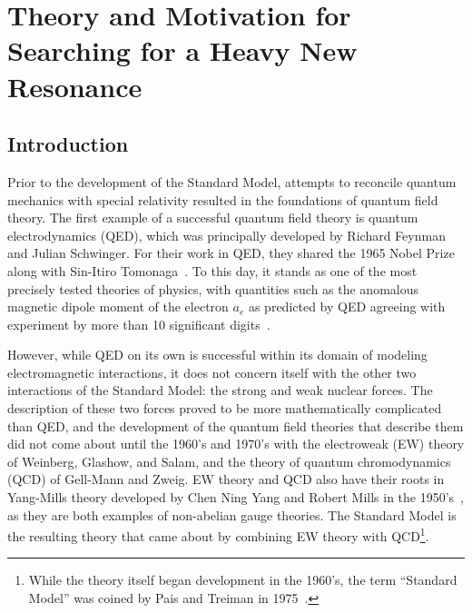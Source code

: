 
\chapter{Theory and Motivation for Searching for a Heavy New Resonance}
\label{chap:theory}

\section{Introduction}

Prior to the development of the Standard Model, attempts to reconcile quantum mechanics with special relativity resulted in the foundations of quantum field theory.
The first example of a successful quantum field theory is quantum electrodynamics (QED), which was principally developed by Richard Feynman and Julian Schwinger.
For their work in QED, they shared the 1965 Nobel Prize along with Sin-Itiro Tomonaga~\cite{NobelPrize:1965-Physics}.
To this day, it stands as one of the most precisely tested theories of physics, with quantities such as the anomalous magnetic dipole moment of the electron $a_e$ as predicted by QED agreeing with experiment by more than 10 significant digits~\cite{Aoyama_2015}.

However, while QED on its own is successful within its domain of modeling electromagnetic interactions, it does not concern itself with the other two interactions of the Standard Model: the strong and weak nuclear forces.
The description of these two forces proved to be more mathematically complicated than QED, and the development of the quantum field theories that describe them did not come about until the 1960's and 1970's with the electroweak (EW) theory of Weinberg, Glashow, and Salam, and the theory of quantum chromodynamics (QCD) of Gell-Mann and Zweig.
EW theory and QCD also have their roots in Yang-Mills theory developed by Chen Ning Yang and Robert Mills in the 1950's~\cite{1954PhRv...96..191Y}, as they are both examples of non-abelian gauge theories.
The Standard Model is the resulting theory that came about by combining EW theory with QCD\footnote{While the theory itself began development in the 1960's, the term ``Standard Model'' was coined by Pais and Treiman in 1975~\cite{CaoFieldTheory}.}.

